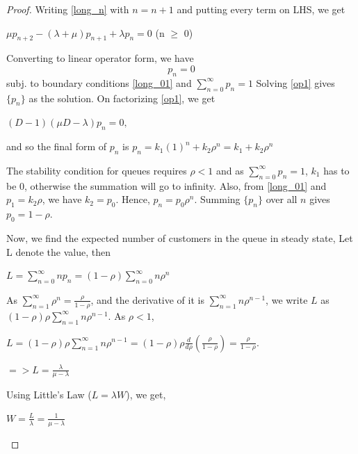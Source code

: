 \begin{proof}
Writing \ref{long_n} with $n = n+1$ and putting every term on LHS, we get
\begin{center}
    $\mu p_{n+2} - (\lambda + \mu)p_{n+1} + \lambda p_n = 0$ \hspace{5mm} (n $\ge$ 0) \\
\end{center}
Converting to linear operator form, we have
\begin{equation}
    [\mu D^2 - (\lambda + \mu)D + \lambda] p_n = 0 \label{op1}
\end{equation}
subj. to boundary conditions \ref{long_01} and $\sum_{n=0}^{\infty} p_n = 1$
Solving \ref{op1} gives $\{ p_n \}$ as the solution.
On factorizing \ref{op1}, we get
\begin{center}
    $(D-1)(\mu D - \lambda)p_n = 0,$
\end{center}
\begin{center}
and so the final form of $p_n$ is
    $p_n = k_1 (1)^n + k_2 \rho ^n = k_1 + k_2 \rho ^n$
\end{center}
The stability condition for queues requires $\rho < 1$ and as $\sum_{n=0}^{\infty} p_n = 1$, $k_1$ has to be 0, otherwise the summation will go to infinity. Also, from \ref{long_01} and $p_1 = k_2 \rho$, we have $k_2 = p_0$. Hence, $p_n = p_0 \rho ^n$.
Summing $\{ p_n \}$ over all $n$ gives $p_0 = 1 - \rho$.

Now, we find the expected number of customers in the queue in steady state,
Let L denote the value, then
\begin{center}
   $L = \sum_{n=0}^{\infty} n p_n = (1- \rho)\sum_{n=0}^{\infty} n \rho^n$
\end{center}
As $\sum_{n=1}^{\infty}\rho^n = \frac{\rho}{1 - \rho}$, and the derivative of it is $\sum_{n=1}^{\infty}n\rho^{n-1}$, we write $L$ as $(1- \rho)\rho \sum_{n=1}^{\infty}n\rho^{n-1}$.
As $\rho < 1$,
\begin{center}
    $L = (1- \rho)\rho \sum_{n=1}^{\infty}n\rho^{n-1} = (1- \rho) \rho \frac{d}{d \rho}(\frac{\rho}{1- \rho}) = \frac{\rho}{1 - \rho}.$
\end{center}

\begin{center}
$=> L = \frac{\lambda}{\mu - \lambda}$
\end{center}
Using Little's Law ($L = \lambda W$), we get,
\begin{center}
	 $W = \frac{L}{\lambda} = \frac{1}{\mu - \lambda}$
\end{center}
\end{proof}
\vspace{20mm}


